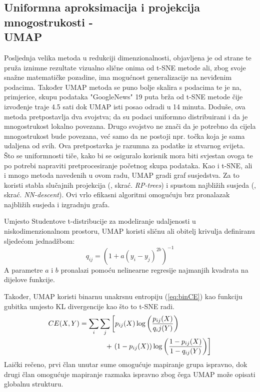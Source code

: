 \documentclass[times, utf8, diplomski]{fer}
\begin{document}
\subsection{Uniformna aproksimacija i projekcija mnogostrukosti -\\ UMAP}

Posljednja velika metoda u redukciji dimenzionalnosti, objavljena je od strane \cite{mcinnes2018umap} te pruža iznimne rezultate vizualno slične onima od t-SNE metode ali, zbog svoje snažne matematičke pozadine, ima mogućnost generalizacije na neviđenim podacima. Također UMAP metoda se puno bolje skalira s podacima te je na, primjerice, skupu podataka "GoogleNews" 19 puta brža od t-SNE metode čije izvođenje traje 4.5 sati dok UMAP isti posao odradi u 14 minuta. Doduše, ova metoda pretpostavlja dva svojstva; da su podaci uniformno distribuirani i da je mnogostrukost lokalno povezana. Drugo svojstvo ne znači da je potrebno da cijela mnogostrukost bude povezana, već samo da ne postoji npr. točka koja je sama udaljena od svih. Ova pretpostavka je razumna za podatke iz stvarnog svijeta. Što se uniformnosti tiče, kako bi se osiguralo korisnik mora biti svjestan ovoga te po potrebi napraviti pretprocesiranje početnog skupa podataka. Kao i t-SNE, ali i mnogo metoda navedenih u ovom radu, UMAP gradi graf susjedstva. Za to koristi stabla slučajnih projekcija (, skrać. \emph{RP-trees}) i spustom najbližih susjeda (, skrać. \emph{NN-descent}). Ovi vrlo efikasni algoritmi omogućuju brz pronalazak najbližih susjeda i izgradnju grafa.

Umjesto Studentove t-distribucije za modeliranje udaljenosti u niskodimenzionalnom prostoru, UMAP koristi sličnu ali obitelj krivulja definiranu sljedećom jednadžbom:
\begin{equation}
    q_{ij} = (1 + a(y_i - y_j)^{2b})^{-1}
\end{equation}
A parametre $a$ i $b$ pronalazi pomoću nelinearne regresije najmanjih kvadrata na dijelove funkcije.

Također, UMAP koristi binarnu unakrsnu entropiju (\ref{eq:binCE}) kao funkciju gubitka umjesto KL divergencije kao što to t-SNE radi.
\begin{align}
    CE(X, Y) & = \sum_i \sum_j \left[ p_{ij}(X) \log \left( \frac{p_{ij}(X)}{q_ij(Y)} \right)
    \right. \nonumber                                                                         \\ &\hphantom{ \sum_i \sum_j \big[} + \left.
        ( 1 - p_{ij}(X)) \log \left(\frac{1 - p_{ij}(X)}{1 - q_{ij}(Y)}\right) \right]
    \label{eq:binCE}
\end{align}
Laički rečeno, prvi član unutar sume omogućuje mapiranje grupa ispravno, dok drugi član omogućuje mapiranje razmaka ispravno zbog čega  UMAP može opisati globalnu strukturu.
\end{document}
